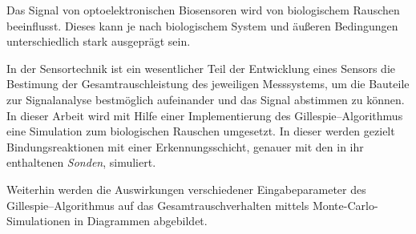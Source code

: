 \thispagestyle{empty}
Das Signal von optoelektronischen Biosensoren wird von biologischem Rauschen beeinflusst. Dieses kann je nach biologischem System und äußeren Bedingungen unterschiedlich stark ausgeprägt sein.\par

In der Sensortechnik ist ein wesentlicher Teil der Entwicklung eines Sensors die Bestimung der Gesamtrauschleistung des jeweiligen Messsystems, um die Bauteile zur Signalanalyse bestmöglich aufeinander und das Signal abstimmen zu können. In dieser Arbeit wird mit Hilfe einer Implementierung des Gillespie--Algorithmus eine Simulation zum biologischen Rauschen umgesetzt. In dieser werden gezielt Bindungsreaktionen mit einer Erkennungsschicht, genauer mit den in ihr enthaltenen \emph{Sonden}, simuliert.\par

Weiterhin werden die Auswirkungen verschiedener Eingabeparameter des Gillespie--Algorithmus auf das Gesamtrauschverhalten mittels Monte-Carlo-Simulationen in Diagrammen abgebildet.\par

